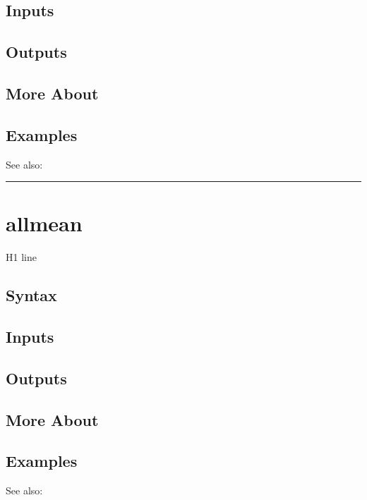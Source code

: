 \documentclass[letterpaper,10pt,english]{sphinxmanual}
\begin{document}
\subsection{Inputs}
\label{classes/time_series/@ts/ts:id25}

\subsection{Outputs}
\label{classes/time_series/@ts/ts:id26}

\subsection{More About}
\label{classes/time_series/@ts/ts:id27}

\subsection{Examples}
\label{classes/time_series/@ts/ts:id28}
See also:


\bigskip\hrule{}\bigskip



\section{allmean}
\label{classes/time_series/@ts/ts:id29}\label{classes/time_series/@ts/ts:allmean}
H1 line


\subsection{Syntax}
\label{classes/time_series/@ts/ts:id30}

\subsection{Inputs}
\label{classes/time_series/@ts/ts:id31}

\subsection{Outputs}
\label{classes/time_series/@ts/ts:id32}

\subsection{More About}
\label{classes/time_series/@ts/ts:id33}

\subsection{Examples}
\label{classes/time_series/@ts/ts:id34}
See also:
\end{document}
